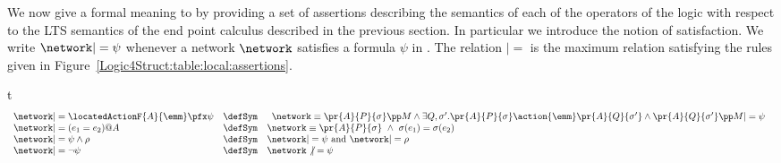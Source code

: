  We now give a formal meaning to \LL by providing a set of assertions
 describing the semantics of each of the operators of the logic with
 respect to the LTS semantics of the end point calculus described in
 the previous section.  In particular we introduce the notion of
 satisfaction.
 We write $\network |= \psi$ whenever a network $\network$ satisfies a
 formula $\psi$ in \LL.  The relation $|=$ is the maximum relation
 satisfying the rules given in
 Figure~\ref{Logic4Struct:table:local:assertions}.  \begin{myfigure}{t}
   { \begin{displaymath} \begin{array}{llllllllllllll}
        \network |= \locatedActionF{A}{\emm}\pfx \psi & \defSym &
         \begin{array}{r} 
           \network \equiv \pr{A}{P}{\sigma} \pp M \land \exists
         Q,\sigma'. \pr{A}{P}{\sigma} \action{\emm} \pr{A}{Q}{\sigma'}
         \land \pr{A}{Q}{\sigma'} \pp M |= \psi 
         \end{array}\\
         \network |= (e_1=e_2)@A & \defSym & \network \equiv
         \pr{A}{P}{\sigma} ~ \land ~ \sigma(e_1) = \sigma(e_2)  \\
         \network |= \psi\land \rho & \defSym & \network |= \psi
         \text{ and } \network |= \rho \\
         \network |= \neg \psi & \defSym & \network \not|= \psi \\

\end{array}
\end{displaymath}}
\end{myfigure}
